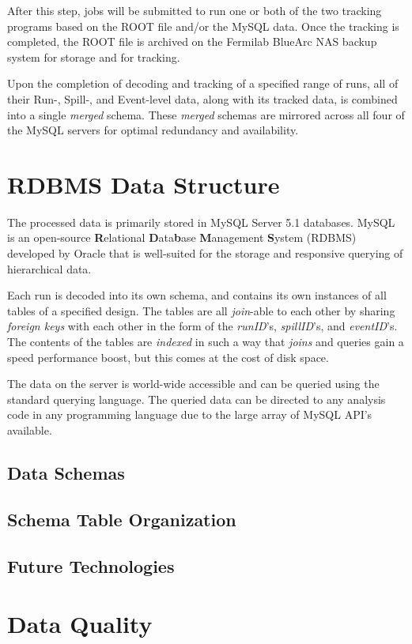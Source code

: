 After this step, jobs will be submitted to run one or both of the two tracking programs based on the ROOT file and/or the MySQL data. Once the tracking is completed, the ROOT file is archived on the Fermilab BlueArc NAS backup system for storage and for tracking.

Upon the completion of decoding and tracking of a specified range of runs, all of their Run-, Spill-, and Event-level data, along with its tracked data, is combined into a single \emph{merged} schema. These \emph{merged} schemas are mirrored across all four of the MySQL servers for optimal redundancy and availability.

\section{RDBMS Data Structure}

The processed data is primarily stored in MySQL Server 5.1 databases. MySQL is an open-source \textbf{R}elational \textbf{D}ata\textbf{b}ase \textbf{M}anagement \textbf{S}ystem (RDBMS) developed by Oracle that is well-suited for the storage and responsive querying of hierarchical data.

Each run is decoded into its own schema, and contains its own instances of all tables of a specified design. The tables are all \emph{join}-able to each other by sharing \emph{foreign keys} with each other in the form of the \emph{runID}'s, \emph{spillID}'s, and \emph{eventID}'s. The contents of the tables are \emph{indexed} in such a way that \emph{joins} and queries gain a speed performance boost, but this comes at the cost of disk space.

The data on the server is world-wide accessible and can be queried using the standard querying language. The queried data can be directed to any analysis code in any programming language due to the large array of MySQL API's available.

\subsection{Data Schemas}

\subsection{Schema Table Organization}

\subsection{Future Technologies}

\section{Data Quality}


